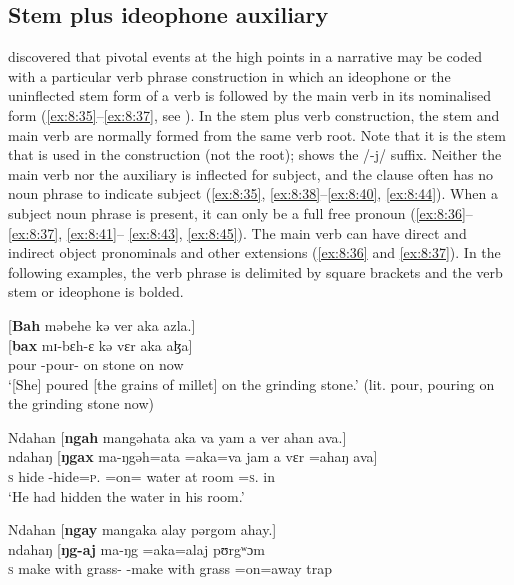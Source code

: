 \subsection{Stem plus ideophone auxiliary}\label{sec:8.2.3}
\hypertarget{RefHeading1212601525720847}{}
\largerpage \citet{FriesenMamalis2008} discovered that pivotal events at the high points in a narrative may be coded with a particular verb phrase construction in which an ideophone or the uninflected stem form of a verb is followed by the main verb in its nominalised form (\ref{ex:8:35}--\ref{ex:8:37}, see ).  In the stem plus verb construction, the stem and main verb are normally formed from the same verb root. Note that it is the stem that is used in the construction (not the root);  shows the \newline/-j/ suffix. Neither the main verb nor the auxiliary is inflected for subject, and the clause often has no noun phrase to indicate subject (\ref{ex:8:35}, \ref{ex:8:38}--\ref{ex:8:40}, \ref{ex:8:44}). When a subject noun phrase is present, it can only be a full free pronoun (\ref{ex:8:36}--\ref{ex:8:37},  \ref{ex:8:41}-- \ref{ex:8:43},  \ref{ex:8:45}). The main verb can have direct and indirect object pronominals and other extensions (\ref{ex:8:36} and \ref{ex:8:37}). In the following examples, the verb phrase is delimited by square brackets and the verb stem or ideophone is bolded. 

\ea \label{ex:8:35}
{}[\textbf{Bah}  məbehe  kə  ver  aka  azla.]\\
\gll  {}[\textbf{bax}    mɪ-bɛh-ɛ    kə  vɛr  aka  aɮa]\\
      pour   {\NOM}{}-pour-{\CL}  on  stone  on  now\\
\glt  ‘[She] poured [the grains of millet] on the grinding stone.’\textit{ }(lit. pour, pouring on the grinding stone now)
\z


\ea \label{ex:8:36}
Ndahan  [\textbf{ngah}  mangəhata  aka  va  yam  a  ver  ahan  ava.]\\
\gll  ndahaŋ  [\textbf{ŋgax}  ma-ŋgəh=ata =aka=va  jam  a  vɛr  =ahaŋ    ava]\\
      \textsc{s}    hide  {\NOM}{}-hide=\textsc{p}.{\IO} =on={\PRF}  water  at  room  =\textsc{s}.{\POSS}  in\\
\glt  ‘He had hidden the water in his room.’
\z

\ea \label{ex:8:37}
Ndahan  [\textbf{ngay}  mangaka  alay  pərgom  ahay.]\\
\gll  ndahaŋ  [\textbf{ŋg-aj}       ma-ŋg           =aka=alaj    pʊrgʷɔm\\  
      \textsc{s}    {make with grass}-{\CL}  {{\NOM}{}-make with grass} =on=away    trap\\   
      

